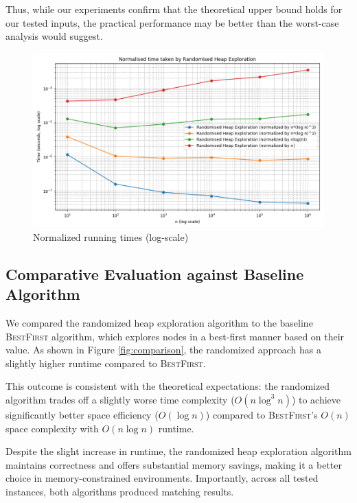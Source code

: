 \documentclass[conference]{IEEEtran}
\begin{document}
Thus, while our experiments confirm that the theoretical upper bound holds for our tested inputs, the practical performance may be better than the worst-case analysis would suggest.

\begin{figure}
    \centering
    \includegraphics[width=1\linewidth]{images/algo-complexity.png}
    \caption{Normalized running times (log-scale)}
    \label{fig:normailsed-run-time}
\end{figure}

\subsection{Comparative Evaluation against Baseline Algorithm}

We compared the randomized heap exploration algorithm to the baseline \textsc{BestFirst} algorithm, which explores nodes in a best-first manner based on their value. As shown in Figure \ref{fig:comparison}, the randomized approach has a slightly higher runtime compared to \textsc{BestFirst}. 

This outcome is consistent with the theoretical expectations: the randomized algorithm trades off a slightly worse time complexity ($O(n \log^3 n)$) to achieve significantly better space efficiency ($O(\log n)$) compared to \textsc{BestFirst}'s $O(n)$ space complexity with $O(n \log n)$ runtime. 

Despite the slight increase in runtime, the randomized heap exploration algorithm maintains correctness and offers substantial memory savings, making it a better choice in memory-constrained environments. Importantly, across all tested instances, both algorithms produced matching results.
\end{document}

